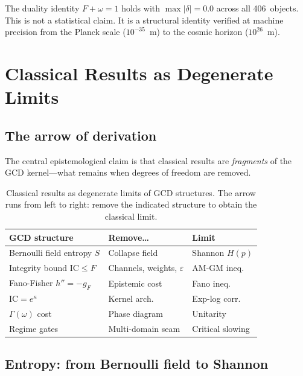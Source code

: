 \documentclass[
  aps,
  prd,
  twocolumn,
  superscriptaddress,
  nofootinbib,
  floatfix
]{revtex4-2}
\newcommand{\Gam}{\Gamma}
\newcommand{\eps}{\varepsilon}
\newcommand{\IC}{\mathrm{IC}}
\newcommand{\gF}{g_{\!F}}
\begin{document}
The duality identity $F + \omega = 1$ holds with
$\max|\delta| = 0.0$ across all 406~objects.  This is not a
statistical claim.  It is a structural identity verified at machine
precision from the Planck scale ($10^{-35}$~m) to the cosmic horizon
($10^{26}$~m).

\section{Classical Results as Degenerate Limits}
\label{sec:degenerate}

\subsection{The arrow of derivation}

The central epistemological claim is that classical results are
\emph{fragments} of the GCD kernel---what remains when degrees of
freedom are removed.

\begin{table}[t]
\caption{\label{tab:degenerate}Classical results as degenerate limits
of GCD structures.  The arrow runs from left to right: remove the
indicated structure to obtain the classical limit.}
\begin{ruledtabular}
\begin{tabular}{p{2.0cm}p{2.2cm}p{2.5cm}}
GCD structure & Remove\ldots & Limit \\
\midrule
Bernoulli field entropy $S$ &
  Collapse field &
  Shannon $H(p)$ \\[3pt]
Integrity bound $\IC \leq F$ &
  Channels, weights, $\eps$ &
  AM-GM ineq. \\[3pt]
Fano-Fisher $h'' = -\gF$ &
  Epistemic cost &
  Fano ineq. \\[3pt]
$\IC = e^\kappa$ &
  Kernel arch. &
  Exp-log corr. \\[3pt]
$\Gam(\omega)$ cost &
  Phase diagram &
  Unitarity \\[3pt]
Regime gates &
  Multi-domain seam &
  Critical slowing
\end{tabular}
\end{ruledtabular}
\end{table}

\subsection{Entropy: from Bernoulli field to Shannon}
\end{document}
